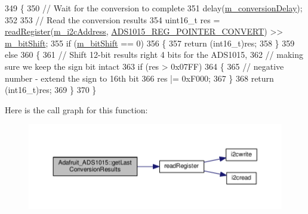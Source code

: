 \begin{DoxyCode}
349 \{
350   \textcolor{comment}{// Wait for the conversion to complete}
351   delay(\hyperlink{class_adafruit___a_d_s1015_aa3a29a64a6705fce1fee21d73c642a0e}{m\_conversionDelay});
352 
353   \textcolor{comment}{// Read the conversion results}
354   uint16\_t res = \hyperlink{_cool_adafruit___a_d_s1015_8cpp_a319539381b7551b2f83a92b0b596e97d}{readRegister}(\hyperlink{class_adafruit___a_d_s1015_a2186993621a7973256d47f086c74035d}{m\_i2cAddress}, 
      \hyperlink{_cool_adafruit___a_d_s1015_8h_a0f462c806b353bd682fa3c2d67e66622}{ADS1015\_REG\_POINTER\_CONVERT}) >> \hyperlink{class_adafruit___a_d_s1015_ab238ce17112a78db2be4ea14d57fb114}{m\_bitShift};
355   \textcolor{keywordflow}{if} (\hyperlink{class_adafruit___a_d_s1015_ab238ce17112a78db2be4ea14d57fb114}{m\_bitShift} == 0)
356   \{
357     \textcolor{keywordflow}{return} (int16\_t)res;
358   \}
359   \textcolor{keywordflow}{else}
360   \{
361     \textcolor{comment}{// Shift 12-bit results right 4 bits for the ADS1015,}
362     \textcolor{comment}{// making sure we keep the sign bit intact}
363     \textcolor{keywordflow}{if} (res > 0x07FF)
364     \{
365       \textcolor{comment}{// negative number - extend the sign to 16th bit}
366       res |= 0xF000;
367     \}
368     \textcolor{keywordflow}{return} (int16\_t)res;
369   \}
370 \}
\end{DoxyCode}
Here is the call graph for this function\+:\nopagebreak
\begin{figure}[H]
\begin{center}
\leavevmode
\includegraphics[width=350pt]{df/df6/class_adafruit___a_d_s1015_ad8f36d80847020778425107f6451a8c2_cgraph}
\end{center}
\end{figure}
\mbox{\label{class_adafruit___a_d_s1015_a56582333958e66efaccd3d4a8a47e3ff}} 
